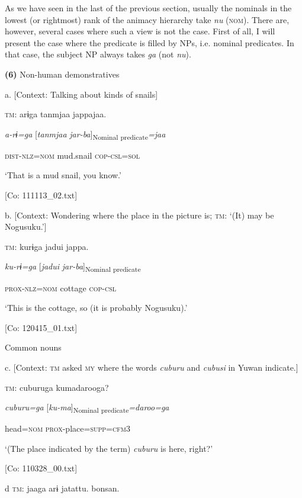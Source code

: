 As we have seen in the last of the previous section, usually the nominals in the lowest (or rightmost) rank of the animacy hierarchy take \textit{nu} (\textsc{nom}). There are, however, several cases where such a view is not the case. First of all, I will present the case where the predicate is filled by NPs, i.e. nominal predicates. In that case, the subject NP always takes \textit{ga} (not \textit{nu}).

\textbf{(6)}  Non-human demonstratives

  a.  [Context: Talking about kinds of snails]

    \textsc{tm}:  arɨga  tanmjaa  jappajaa.

      \textit{a-rɨ=ga}  [\textit{tanmjaa}  \textit{jar-ba}]\textsubscript{Nominal predicate}\textit{=jaa}

      \textsc{dist}-\textsc{nlz}=\textsc{nom}  mud.snail  \textsc{cop}-\textsc{csl}=\textsc{sol}

      ‘That is a mud snail, you know.’

      [Co: 111113\_02.txt]

  b.  [Context: Wondering where the place in the picture is; \textsc{tm}: ‘(It) may be Nogusuku.’]

    \textsc{tm}:  kurɨga  jadui  jappa.

      \textit{ku-rɨ=ga}  [\textit{jadui}  \textit{jar-ba}]\textsubscript{Nominal predicate}

      \textsc{prox}-\textsc{nlz}=\textsc{nom}  cottage  \textsc{cop}-\textsc{csl}

      ‘This is the cottage, so (it is probably Nogusuku).’

      [Co: 120415\_01.txt]

  Common nouns

  c.  [Context: \textsc{tm} asked \textsc{my} where the words \textit{cuburu} and \textit{cubusi} in Yuwan indicate.]

    \textsc{tm}:  cuburuga  kumadarooga?

      \textit{cuburu=ga}  [\textit{ku-ma}]\textsubscript{Nominal predicate}\textit{=daroo=ga}

      head=\textsc{nom}  \textsc{prox}-place=\textsc{supp}=\textsc{cfm}3

      ‘(The place indicated by the term) \textit{cuburu} is here, right?’

      [Co: 110328\_00.txt]

  d  \textsc{tm}:  jaaga  arɨ  jatattu.  bonsan.

